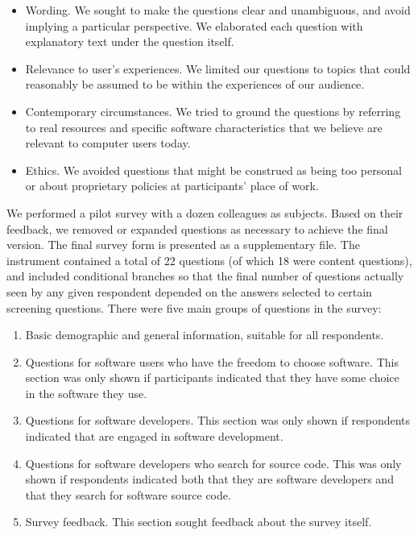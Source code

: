 \documentclass[review]{elsarticle}
\begin{document}
\begin{itemize}

\item Wording.  We sought to make the questions clear and unambiguous, and avoid implying a particular perspective.  We elaborated each question with explanatory text under the question itself.

\item Relevance to user's experiences.  We limited our questions to topics that could reasonably be assumed to be within the experiences of our audience.

\item Contemporary circumstances.  We tried to ground the questions by referring to real resources and specific software characteristics that we believe are relevant to computer users today.

\item Ethics.  We avoided questions that might be construed as being too personal or about proprietary policies at participants' place of work.

\end{itemize}

We performed a pilot survey with a dozen colleagues as subjects.  Based on their feedback, we removed or expanded questions as necessary to achieve the final version.  The final survey form is presented as a supplementary file.  The instrument contained a total of 22 questions (of which 18 were content questions), and included conditional branches so that the final number of questions actually seen by any given respondent depended on the answers selected to certain screening questions.  There were five main groups of questions in the survey:

\begin{enumerate}

\item Basic demographic and general information, suitable for all respondents.

\item Questions for software users who have the freedom to choose software.  This section was only shown if participants indicated that they have some choice in the software they use.

\item Questions for software developers.  This section was only shown if respondents indicated that are engaged in software development.

\item Questions for software developers who search for source code.  This was only shown if respondents indicated both that they are software developers and that they search for software source code.

\item Survey feedback.  This section sought feedback about the survey itself.

\end{enumerate}
\end{document}
